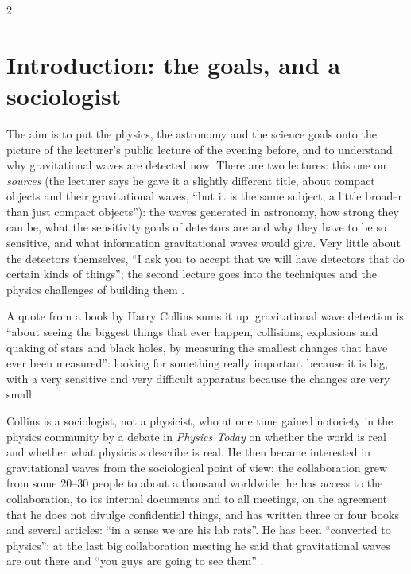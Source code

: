 \begin{paracol}{2}
\section{Introduction: the goals, and a sociologist}\label{sec:c27-intro}

The aim is to put the physics, the astronomy and the science goals onto the picture of the lecturer's public lecture of the evening before, and to understand why gravitational waves are detected now. There are two lectures: this one on \emph{sources} (the lecturer says he gave it a slightly different title, about compact objects and their gravitational waves, ``but it is the same subject, a little broader than just compact objects''): the waves generated in astronomy, how strong they can be, what the sensitivity goals of detectors are and why they have to be so sensitive, and what information gravitational waves would give. Very little about the detectors themselves, ``I ask you to accept that we will have detectors that do certain kinds of things''; the second lecture goes into the techniques and the physics challenges of building them .

A quote from a book by Harry Collins sums it up: gravitational wave detection is ``about seeing the biggest things that ever happen, collisions, explosions and quaking of stars and black holes, by measuring the smallest changes that have ever been measured'': looking for something really important because it is big, with a very sensitive and very difficult apparatus because the changes are very small .

\begin{aside}
Collins is a sociologist, not a physicist, who at one time gained notoriety in the physics community by a debate in \emph{Physics Today} on whether the world is real and whether what physicists describe is real. He then became interested in gravitational waves from the sociological point of view: the collaboration grew from some 20--30 people to about a thousand worldwide; he has access to the collaboration, to its internal documents and to all meetings, on the agreement that he does not divulge confidential things, and has written three or four books and several articles: ``in a sense we are his lab rats''. He has been ``converted to physics'': at the last big collaboration meeting he said that gravitational waves are out there and ``you guys are going to see them'' .


\end{aside}
\end{paracol}

